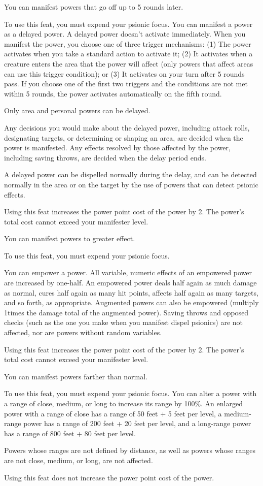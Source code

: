 {You can manifest powers that go off up to 5 rounds later.}
{}
{To use this feat, you must expend your psionic focus. You can manifest a power as a delayed power. A delayed power doesn't activate immediately. When you manifest the power, you choose one of three trigger mechanisms: (1) The power activates when you take a standard action to activate it; (2) It activates when a creature enters the area that the power will affect (only powers that affect areas can use this trigger condition); or (3) It activates on your turn after 5 rounds pass. If you choose one of the first two triggers and the conditions are not met within 5 rounds, the power activates automatically on the fifth round.

Only area and personal powers can be delayed.

Any decisions you would make about the delayed power, including attack rolls, designating targets, or determining or shaping an area, are decided when the power is manifested. Any effects resolved by those affected by the power, including saving throws, are decided when the delay period ends.

A delayed power can be dispelled normally during the delay, and can be detected normally in the area or on the target by the use of powers that can detect psionic effects.

Using this feat increases the power point cost of the power by 2. The power's total cost cannot exceed your manifester level.}{}{}

{You can manifest powers to greater effect.}
{}
{To use this feat, you must expend your psionic focus.

You can empower a power. All variable, numeric effects of an empowered power are increased by one-half. An empowered power deals half again as much damage as normal, cures half again as many hit points, affects half again as many targets, and so forth, as appropriate. Augmented powers can also be empowered (multiply 1\onehalf times the damage total of the augmented power). Saving throws and opposed checks (such as the one you make when you manifest dispel psionics) are not affected, nor are powers without random variables.

Using this feat increases the power point cost of the power by 2. The power's total cost cannot exceed your manifester level.}{}{}

{You can manifest powers farther than normal.}
{}
{To use this feat, you must expend your psionic focus. You can alter a power with a range of close, medium, or long to increase its range by 100\%. An enlarged power with a range of close has a range of 50 feet + 5 feet per level, a medium-range power has a range of 200 feet + 20 feet per level, and a long-range power has a range of 800 feet + 80 feet per level.

Powers whose ranges are not defined by distance, as well as powers whose ranges are not close, medium, or long, are not affected.

Using this feat does not increase the power point cost of the power.}{}{}

